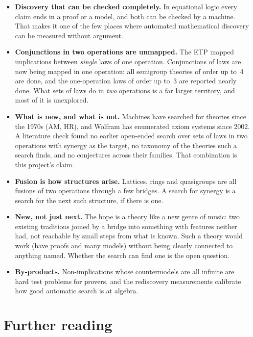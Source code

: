 \documentclass[11pt,a4paper]{article}
\begin{document}
\begin{itemize}
\item \textbf{Discovery that can be checked completely.} In equational logic every claim ends in a proof or a model,
  and both can be checked by a machine. That makes it one of the few places where automated mathematical discovery
  can be measured without argument.
\item \textbf{Conjunctions in two operations are unmapped.} The ETP mapped implications between \emph{single} laws of
  one operation. Conjunctions of laws are now being mapped in one operation: all semigroup theories of order up to~4
  are done, and the one-operation laws of order up to~3 are reported nearly done. What sets of laws do in \emph{two} operations is a far larger
  territory, and most of it is unexplored.
\item \textbf{What is new, and what is not.} Machines have searched for theories since the 1970s (AM, HR), and Wolfram
  has enumerated axiom systems since 2002. A literature check found no earlier open-ended search over sets of laws in
  two operations with synergy as the target, no taxonomy of the theories such a search finds, and no conjectures
  across their families. That combination is this project's claim.
\item \textbf{Fusion is how structures arise.} Lattices, rings and quasigroups are all fusions of two operations
  through a few bridges. A search for synergy is a search for the next such structure, if there is one.
\item \textbf{New, not just next.} The hope is a theory like a new genre of music: two existing traditions joined by
  a bridge into something with features neither had, not reachable by small steps from what is known. Such a theory
  would work (have proofs and many models) without being clearly connected to anything named. Whether the search
  can find one is the open question.
\item \textbf{By-products.} Non-implications whose countermodels are all infinite are hard test problems for
  provers, and the rediscovery measurements calibrate how good automatic search is at algebra.
\end{itemize}

\section{Further reading}
\end{document}
